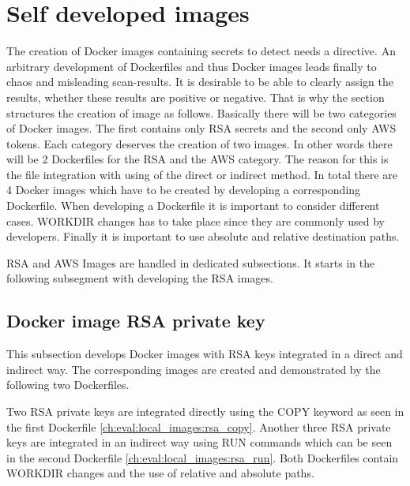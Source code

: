 \section{Self developed images}
\label{ch:eval:local_images}
The creation of Docker images containing secrets to detect needs a directive. An arbitrary development of Dockerfiles and thus Docker images leads finally to chaos and misleading scan-results. 
It is desirable to be able to clearly assign the results, whether these results are positive or negative. That is why the section structures the creation of image as follows. Basically there will be two categories of Docker images. The first contains only RSA secrets and the second only AWS tokens. Each category deserves the creation of two images. In other words there will be 2 Dockerfiles for the RSA and the AWS category. The reason for this is the file integration with using of the direct or indirect method. In total there are 4 Docker images which have to be created by developing a corresponding Dockerfile. When developing a Dockerfile it is important to consider different cases. WORKDIR changes has to take place since they are commonly used by developers. Finally it is important to use absolute and relative destination paths. 

RSA and AWS Images are handled in dedicated subsections. It starts in the following subsegment with developing the RSA images.

\subsection{Docker image RSA private key}
\label{ch:eval:local_images:rsa}
This subsection develops Docker images with RSA keys integrated in a direct and indirect way. The corresponding images are created and demonstrated by the following two Dockerfiles.


Two RSA private keys are integrated directly using the COPY keyword as seen in the first Dockerfile \ref{ch:eval:local_images:rsa_copy}. Another three RSA private keys are integrated in an indirect way using RUN commands which can be seen in the second Dockerfile \ref{ch:eval:local_images:rsa_run}. Both Dockerfiles contain WORKDIR changes and the use of relative and absolute paths. 

